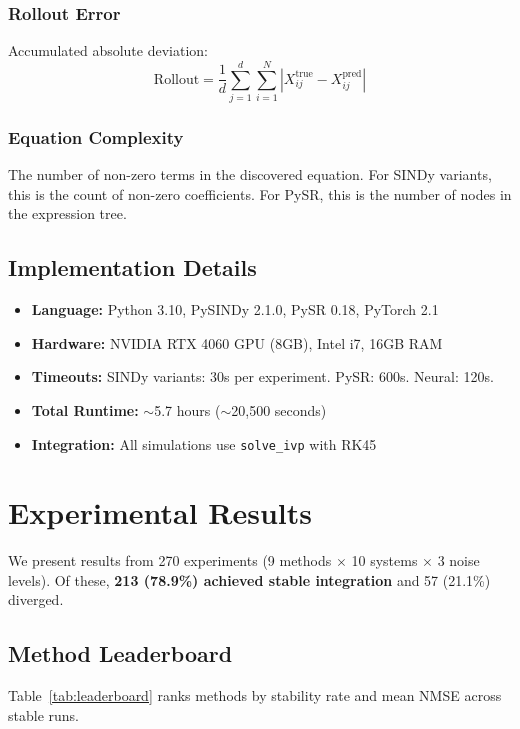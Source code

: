 \documentclass[conference]{IEEEtran}
\begin{document}
\subsubsection{Rollout Error}
Accumulated absolute deviation:
\begin{equation}
\text{Rollout} = \frac{1}{d}\sum_{j=1}^{d}\sum_{i=1}^{N} |X_{ij}^\text{true} - X_{ij}^\text{pred}|
\end{equation}

\subsubsection{Equation Complexity}
The number of non-zero terms in the discovered equation. For SINDy variants, this is the count of non-zero coefficients. For PySR, this is the number of nodes in the expression tree.

\subsection{Implementation Details}
\begin{itemize}
    \item \textbf{Language:} Python 3.10, PySINDy 2.1.0, PySR 0.18, PyTorch 2.1
    \item \textbf{Hardware:} NVIDIA RTX 4060 GPU (8GB), Intel i7, 16GB RAM
    \item \textbf{Timeouts:} SINDy variants: 30s per experiment. PySR: 600s. Neural: 120s.
    \item \textbf{Total Runtime:} $\sim$5.7 hours ($\sim$20,500 seconds)
    \item \textbf{Integration:} All simulations use \texttt{solve\_ivp} with RK45
\end{itemize}

\section{Experimental Results}
\label{sec:results}

We present results from 270 experiments (9 methods $\times$ 10 systems $\times$ 3 noise levels). Of these, \textbf{213 (78.9\%) achieved stable integration} and 57 (21.1\%) diverged.

\subsection{Method Leaderboard}

Table~\ref{tab:leaderboard} ranks methods by stability rate and mean NMSE across stable runs.
\end{document}

